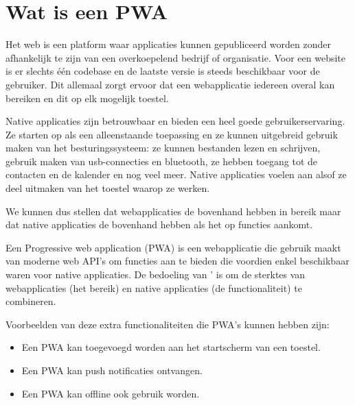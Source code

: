 
\section{Wat is een PWA}
\label{ch: Wat is een PWA}


Het web is een platform waar applicaties kunnen gepubliceerd worden zonder afhankelijk te zijn van een overkoepelend bedrijf of organisatie. Voor een website is er slechts één codebase en de laatste versie is steeds beschikbaar voor de gebruiker. 
Dit allemaal zorgt ervoor dat een webapplicatie iedereen overal kan bereiken en dit op elk mogelijk toestel.

Native applicaties zijn betrouwbaar en bieden een heel goede gebruikerservaring. Ze starten op als een alleenstaande toepassing en ze kunnen uitgebreid gebruik maken van het besturingssysteem: ze kunnen bestanden lezen en schrijven, gebruik maken van usb-connecties en bluetooth, ze hebben toegang tot de contacten en de kalender en nog veel meer. Native applicaties voelen aan alsof ze deel uitmaken van het toestel waarop ze werken.

We kunnen dus stellen dat webapplicaties de bovenhand hebben in bereik maar dat native applicaties de bovenhand hebben als het op functies aankomt.

Een Progressive web application (PWA) is een webapplicatie die gebruik maakt van moderne web API’s om functies aan te bieden die voordien enkel beschikbaar waren voor native applicaties. De bedoeling van ' is om de sterktes van webapplicaties (het bereik) en native applicaties (de functionaliteit) te combineren. 
\autocite{Richard2020}
\autocite{Google2020}

Voorbeelden van deze extra functionaliteiten die PWA's kunnen hebben zijn: 

\begin{itemize}
	\item Een PWA kan toegevoegd worden aan het startscherm van een toestel.
	\item Een PWA kan push notificaties ontvangen.
	\item Een PWA kan offline ook gebruik worden.
\end{itemize}




